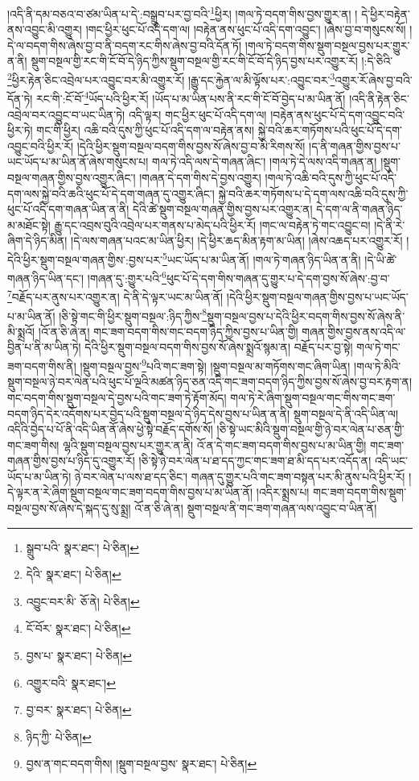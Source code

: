 །འདི་ནི་དམ་བཅའ་བ་ཙམ་ཡིན་པ་དེ་:བསྒྲུབ་པར་བྱ་བའི་\footnote{སྒྲུབ་པའི་  སྣར་ཐང་།  པེ་ཅིན། }ཕྱིར། །གལ་ཏེ་བདག་གིས་བྱས་གྱུར་ན། །
དེ་ཕྱིར་བརྟེན་ནས་འབྱུང་མི་འགྱུར། །གང་ཕྱིར་ཕུང་པོ་འདི་དག་ལ། །བརྟེན་ནས་ཕུང་པོ་འདི་དག་འབྱུང་། །ཞེས་བྱ་བ་གསུངས་སོ། །དེ་ལ་བདག་གིས་ཞེས་བྱ་བ་ནི་བདག་རང་གིས་ཞེས་བྱ་བའི་དོན་ཏོ། །གལ་ཏེ་བདག་གིས་སྡུག་བསྔལ་བྱས་པར་གྱུར་ན་ནི། སྡུག་བསྔལ་གྱི་རང་གི་ངོ་བོ་དེ་ཉིད་ཀྱིས་སྡུག་བསྔལ་གྱི་རང་གི་ངོ་བོ་དེ་ཉིད་བྱས་པར་འགྱུར་རོ། །:དེ་ཅིའི་\footnote{དེའི་  སྣར་ཐང་།  པེ་ཅིན། }ཕྱིར་རྟེན་ཅིང་འབྲེལ་པར་འབྱུང་བར་མི་འགྱུར་རོ། །རྒྱུ་དང་རྐྱེན་ལ་མི་ལྟོས་པར་:འབྱུང་བར་\footnote{འབྱུང་བར་མི་  ཅོ་ནེ།  པེ་ཅིན། }འགྱུར་རོ་ཞེས་བྱ་བའི་དོན་ཏེ། རང་གི་:ངོ་བོ་\footnote{ངོ་བོར་  སྣར་ཐང་།  པེ་ཅིན། }ཡོད་པའི་ཕྱིར་རོ། །ཡོད་པ་མ་ཡིན་པས་ནི་རང་གི་ངོ་བོ་བྱེད་པ་མ་ཡིན་ནོ། །འདི་ནི་རྟེན་ཅིང་འབྲེལ་བར་འབྱུང་བ་ཡང་ཡིན་ཏེ། འདི་ལྟར། གང་ཕྱིར་ཕུང་པོ་འདི་དག་ལ། །བརྟེན་ནས་ཕུང་པོ་དེ་དག་འབྱུང་བའི་ཕྱིར་ཏེ། གང་གི་ཕྱིར། འཆི་བའི་དུས་ཀྱི་ཕུང་པོ་འདི་དག་ལ་བརྟེན་ནས། སྐྱེ་བའི་ཆར་གཏོགས་པའི་ཕུང་པོ་དེ་དག་འབྱུང་བའི་ཕྱིར་རོ། །དེའི་ཕྱིར་སྡུག་བསྔལ་བདག་གིས་བྱས་སོ་ཞེས་བྱ་བ་མི་རིགས་སོ། །ད་ནི་གཞན་གྱིས་བྱས་པ་ཡང་ཡོད་པ་མ་ཡིན་ནོ་ཞེས་གསུངས་པ། གལ་ཏེ་འདི་ལས་དེ་གཞན་ཞིང་། །གལ་ཏེ་དེ་ལས་འདི་གཞན་ན། །སྡུག་བསྔལ་གཞན་གྱིས་བྱས་འགྱུར་ཞིང་། །གཞན་དེ་དག་གིས་དེ་བྱས་འགྱུར། །གལ་ཏེ་འཆི་བའི་དུས་ཀྱི་ཕུང་པོ་འདི་དག་ལས་སྐྱེ་བའི་ཆའི་ཕུང་པོ་དེ་དག་གཞན་དུ་འགྱུར་ཞིང་། སྐྱེ་བའི་ཆར་གཏོགས་པ་དེ་དག་ལས་འཆི་བའི་དུས་ཀྱི་ཕུང་པོ་འདི་དག་གཞན་ཡིན་ན་ནི། དེའི་ཚེ་སྡུག་བསྔལ་གཞན་གྱིས་བྱས་པར་འགྱུར་ན། དེ་དག་ལ་ནི་གཞན་ཉིད་མ་མཐོང་སྟེ། རྒྱུ་དང་འབྲས་བུའི་འབྲེལ་པར་གནས་པ་མེད་པའི་ཕྱིར་རོ། །གང་ལ་བརྟེན་ཏེ་གང་འབྱུང་བ། །དེ་ནི་རེ་ཞིག་དེ་ཉིད་མིན། །དེ་ལས་གཞན་པའང་མ་ཡིན་ཕྱིར། །དེ་ཕྱིར་ཆད་མིན་རྟག་མ་ཡིན། །ཞེས་འཆད་པར་འགྱུར་རོ། །དེའི་ཕྱིར་སྡུག་བསྔལ་གཞན་གྱིས་:བྱས་པར་\footnote{བྱས་པ་  སྣར་ཐང་།  པེ་ཅིན། }ཡང་ཡོད་པ་མ་ཡིན་ནོ། །གལ་ཏེ་གཞན་ཉིད་ཡིན་ན་ནི། །དེ་ཡི་ཚེ་གཞན་ཉིད་ཡིན་དང་། །གཞན་དུ་:གྱུར་པའི་\footnote{འགྱུར་བའི་  སྣར་ཐང་། }ཕུང་པོ་དེ་དག་གིས་གཞན་དུ་གྱུར་པ་དེ་དག་བྱས་སོ་ཞེས་:བྱ་བ་\footnote{བྱ་བར་  སྣར་ཐང་།  པེ་ཅིན། }བརྗོད་པར་ནུས་པར་འགྱུར་ན། དེ་ནི་དེ་ལྟར་ཡང་མ་ཡིན་ནོ། །དེའི་ཕྱིར་སྡུག་བསྔལ་གཞན་གྱིས་བྱས་པ་ཡང་ཡོད་པ་མ་ཡིན་ནོ། །ཅི་སྟེ་གང་གི་ཕྱིར་སྡུག་བསྔལ་:ཉིད་ཀྱིས་\footnote{ཉིད་ཀྱི་  པེ་ཅིན། }སྡུག་བསྔལ་བྱས་པ་དེའི་ཕྱིར་བདག་གིས་བྱས་སོ་ཞེས་ནི་མི་སྨྲའོ། །འོ་ན་ཅི་ཞེ་ན། གང་ཟག་བདག་གིས་གང་བདག་ཉིད་ཀྱིས་བྱས་པ་ཡིན་གྱི། གཞན་གྱིས་བྱས་ནས་འདི་ལ་བྱིན་པ་ནི་མ་ཡིན་ཏེ། དེའི་ཕྱིར་སྡུག་བསྔལ་བདག་གིས་བྱས་སོ་ཞེས་སྨྲའོ་སྙམ་ན། བརྗོད་པར་བྱ་སྟེ། གལ་ཏེ་གང་ཟག་བདག་གིས་ནི། །སྡུག་བསྔལ་བྱས་\footnote{བྱས་ན་གང་བདག་གིས། །སྡུག་བསྔལ་བྱས་  སྣར་ཐང་།  པེ་ཅིན། }པའི་གང་ཟག་སྟེ། །སྡུག་བསྔལ་མ་གཏོགས་གང་ཞིག་ཡིན། །གལ་ཏེ་མིའི་སྡུག་བསྔལ་ཉེ་བར་ལེན་པའི་ཕུང་པོ་ལྔའི་མཚན་ཉིད་ཅན་འདི་གང་ཟག་བདག་ཉིད་ཀྱིས་བྱས་སོ་ཞེས་བྱ་བར་རྟག་ན། གང་བདག་གིས་སྡུག་བསྔལ་དེ་བྱས་པའི་གང་ཟག་ཏེ་རྟོག་མོད། གལ་ཏེ་རེ་ཞིག་སྡུག་བསྔལ་གང་གིས་གང་ཟག་བདག་ཉིད་དེར་འདོགས་པར་བྱེད་པའི་སྡུག་བསྔལ་དེ་ཉིད་དེས་བྱས་པ་ཡིན་ན་ནི། སྡུག་བསྔལ་དེ་ནི་འདི་ཡིན་ལ། འདིའི་བྱེད་པ་པོ་ནི་འདི་ཡིན་ནོ་ཞེས་ཕྱེ་སྟེ་བརྗོད་དགོས་སོ། །ཅི་སྟེ་ཡང་མིའི་སྡུག་བསྔལ་གྱི་ཉེ་བར་ལེན་པ་ཅན་གྱི་གང་ཟག་གིས། ལྷའི་སྡུག་བསྔལ་བྱས་པར་གྱུར་ན་ནི། འོ་ན་དེ་གང་ཟག་བདག་གིས་བྱས་པ་མ་ཡིན་གྱི། གང་ཟག་གཞན་གྱིས་བྱས་པ་ཉིད་དུ་འགྱུར་རོ། །ཅི་སྟེ་ཉེ་བར་ལེན་པ་ཐ་དད་ཀྱང་གང་ཟག་ཐ་མི་དད་པར་འདོད་ན། འདི་ཡང་ཡོད་པ་མ་ཡིན་ཏེ། ཉེ་བར་ལེན་པ་ལས་ཐ་དད་ཅིང་། གཞན་དུ་གྱུར་པའི་གང་ཟག་བསྟན་པར་མི་ནུས་པའི་ཕྱིར་རོ། །དེ་ལྟར་ན་རེ་ཞིག་སྡུག་བསྔལ་གང་ཟག་བདག་གིས་བྱས་པ་མ་ཡིན་ནོ། །འདིར་སྨྲས་པ། གང་ཟག་བདག་གིས་སྡུག་བསྔལ་བྱས་སོ་ཞེས་དེ་སྐད་དུ་སུ་སྨྲ། འོ་ན་ཅི་ཞེ་ན། སྡུག་བསྔལ་ནི་གང་ཟག་གཞན་ལས་འབྱུང་བ་ཡིན་ནོ། 